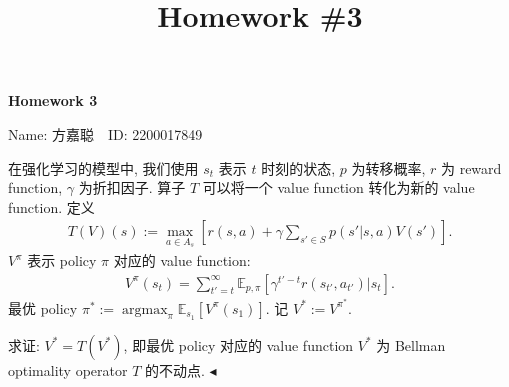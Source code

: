 \documentclass[11pt]{article}
\title{Homework \#3}
\newenvironment{problem}[2][Problem]{\begin{trivlist}
    \item[\hskip \labelsep {\bfseries #1}\hskip \labelsep {\bfseries #2.}]\songti}{\hfill$\blacktriangleleft$\end{trivlist}}
\newcommand\1{\mathds{1}}
\newcommand\E{\mathbb{E}}
\DeclareMathOperator*{\argmax}{argmax} %
\begin{document}
\kaishu

\pagestyle{fancy}
\chead{\kaishu }
\fancyfoot[R]{} 
\fancyfoot[C]{\thepage\ /\ \pageref{LastPage} \\ \textcolor{lightgray}{Last Compile: \today}}


\begin{center}
    {\LARGE \bf Homework 3}

    {Name: 方嘉聪\ \  ID: 2200017849}            %
\end{center}

\begin{problem}{1}
    在强化学习的模型中, 我们使用 $s_t$ 表示 $t$ 时刻的状态, $p$ 为转移概率, $r$ 为 reward function, $\gamma$ 为折扣因子. 
    算子 $T$ 可以将一个 value function 转化为新的 value function. 定义
    \begin{align*}
        T(V)(s) := \max_{a\in A_s} \left[r(s, a) + \gamma \sum_{s'\in S} p(s'|s, a) V(s')\right].
    \end{align*}
    $V^{\pi}$ 表示 policy $\pi$ 对应的 value function: 
    \begin{align*}
        V^{\pi}(s_t) = \sum_{t'=t}^{\infty} \E_{p,\pi}[\gamma^{t'-t} r(s_{t'}, a_{t'})|s_t]. 
    \end{align*}
    最优 policy $\pi^* := \argmax_\pi \E_{s_1}[V^\pi(s_1)]$. 记 $V^* := V^{\pi^*}$. 

    求证: $V^* = T(V^*)$, 即最优 policy 对应的 value function $V^*$ 为 Bellman optimality operator $T$ 的不动点.
\end{problem}
\end{document}
